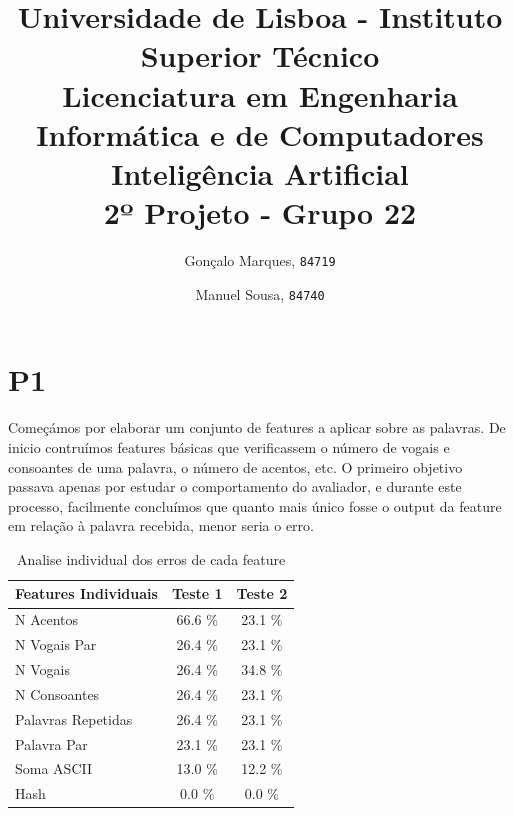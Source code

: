 \documentclass[11pt,twocolumn]{article}
\begin{document}
    
    \title{
        \textnormal{
        \LARGE Universidade de Lisboa - Instituto Superior Técnico\\
        \Large Licenciatura em Engenharia Informática e de Computadores\\
        \Large Inteligência Artificial
    \\}
        \LARGE2º Projeto - Grupo 22
        \vspace{-1ex}
        }
    \author{Gonçalo Marques,
        \texttt{84719}
        \and
        Manuel Sousa,
        \texttt{84740}
    }
    \date{	\vspace{-1ex}
            \vspace{-4ex}
        }
    \maketitle
    
    \section*{P1}
    
    Começámos por elaborar um conjunto de features a aplicar sobre as palavras. De inicio contruímos features básicas que verificassem o número de vogais e consoantes de uma palavra, o número de acentos, etc. O primeiro objetivo passava apenas por estudar
    o comportamento do avaliador, e durante este processo, facilmente concluímos que quanto mais único fosse o output da feature em relação à palavra recebida, menor seria o erro.
    
    
    \begin{table}[htbp]
        \centering
        \caption{Analise individual dos erros de cada feature}
        \label{my-label}
        \begin{tabular}{|l|c|c|}
        \hline
        \multicolumn{1}{|c|}{Features Individuais}     & \textbf{Teste 1} & \textbf{Teste 2}                    \\ \hline
        [F1] N Acentos & 66.6 \%   & 23.1 \% \\ \hline
        [F2] N Vogais Par & 26.4 \%   & 23.1 \% \\ \hline
        [F3] N Vogais & 26.4 \%   & 34.8 \% \\ \hline
        [F4] N Consoantes   & 26.4 \%  & 23.1 \%      \\ \hline
        [F5] Palavras Repetidas   & 26.4 \%  & 23.1 \%      \\ \hline
        [F6] Palavra Par   & 23.1 \%  & 23.1 \%      \\ \hline
        [F7] Soma ASCII                             & 13.0 \%            & 12.2 \%                                \\ \hline
        [F8] Hash                             & 0.0 \%              & 0.0 \%                                \\ \hline
        \end{tabular}
        \end{table}
    \par
\end{document}

